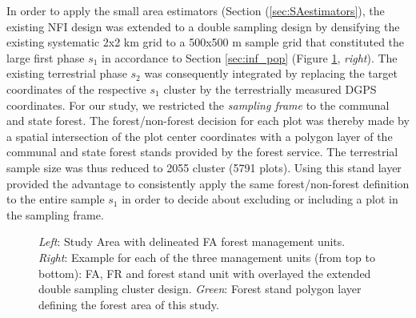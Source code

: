 In order to apply the small area estimators (Section (\ref{sec:SAestimators}), the existing NFI design was extended to a double sampling design by densifying the existing systematic 2x2 km grid to a 500x500 m sample grid that constituted the large first phase $s_1$ in accordance to Section \ref{sec:inf_pop} (Figure \ref{fig:StudyArea}, \textit{right}). The existing terrestrial phase $s_2$ was consequently integrated by replacing the target coordinates of the respective $s_1$ cluster by the terrestrially measured DGPS coordinates. For our study, we restricted the \textit{sampling frame} to the communal and state forest. The forest/non-forest decision for each plot was thereby made by a spatial intersection of the plot center coordinates with a polygon layer of the communal and state forest stands provided by the forest service. The terrestrial sample size was thus reduced to 2055 cluster (5791 plots). Using this stand layer provided the advantage to consistently apply the same forest/non-forest definition to the entire sample $s_1$ in order to decide about excluding or including a plot in the sampling frame.

\begin{figure}[H]
	\centering
	\caption{\textit{Left}: Study Area with delineated FA forest management units. \textit{Right}: Example for each of the three management units (from top to bottom): FA, FR and forest stand unit with overlayed the extended double sampling cluster design. \textit{Green}: Forest stand polygon layer defining the forest area of this study.}
	\label{fig:StudyArea}
\end{figure}



%
%
%
%


